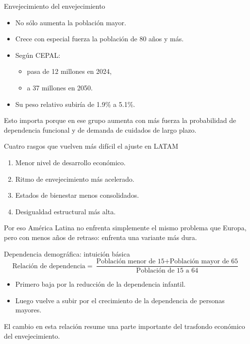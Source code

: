 \documentclass{beamer}
\begin{document}
\begin{frame}{Envejecimiento del envejecimiento}
\begin{itemize}
    \item No sólo aumenta la población mayor.
    \item Crece con especial fuerza la población de 80 años y más.
    \item Según CEPAL:
    \begin{itemize}
        \item pasa de 12 millones en 2024,
        \item a 37 millones en 2050.
    \end{itemize}
    \item Su peso relativo subiría de 1.9\% a 5.1\%.
\end{itemize}

\vspace{0.3cm}
Esto importa porque en ese grupo aumenta con más fuerza la probabilidad de dependencia funcional y de demanda de cuidados de largo plazo.
\end{frame}

\begin{frame}{Cuatro rasgos que vuelven más difícil el ajuste en LATAM}
\begin{enumerate}
    \item Menor nivel de desarrollo económico.
    \item Ritmo de envejecimiento más acelerado.
    \item Estados de bienestar menos consolidados.
    \item Desigualdad estructural más alta.
\end{enumerate}

\vspace{0.3cm}
Por eso América Latina no enfrenta simplemente el mismo problema que Europa, pero con menos años de retraso: enfrenta una variante más dura.
\end{frame}

\begin{frame}{Dependencia demográfica: intuición básica}
\[
\text{Relación de dependencia}=
\frac{\text{Población menor de 15}+\text{Población mayor de 65}}{\text{Población de 15 a 64}}
\]

\begin{itemize}
    \item Primero baja por la reducción de la dependencia infantil.
    \item Luego vuelve a subir por el crecimiento de la dependencia de personas mayores.
\end{itemize}

\vspace{0.3cm}
El cambio en esta relación resume una parte importante del trasfondo económico del envejecimiento.
\end{frame}
\end{document}
